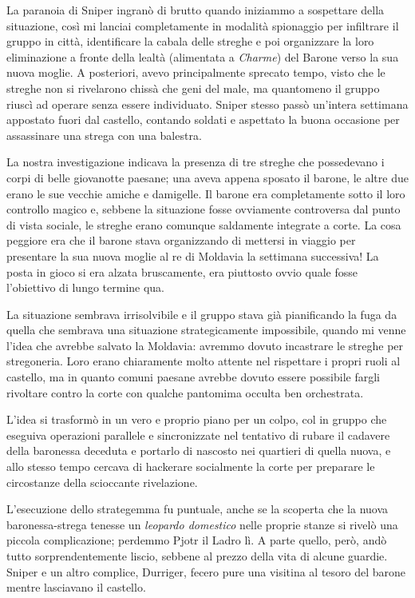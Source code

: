 La paranoia di Sniper ingranò di brutto quando iniziammo a sospettare della situazione, così mi lanciai completamente in modalità spionaggio per infiltrare il gruppo in città, identificare la cabala delle streghe e poi organizzare la loro eliminazione a fronte della lealtà (alimentata a \textit{Charme}) del Barone verso la sua nuova moglie. A posteriori, avevo principalmente sprecato tempo, visto che le streghe non si rivelarono chissà che geni del male, ma quantomeno il gruppo riuscì ad operare senza essere individuato. Sniper stesso passò un'intera settimana appostato fuori dal castello, contando soldati e aspettato la buona occasione per assassinare una strega con una balestra.

La nostra investigazione indicava la presenza di tre streghe che possedevano i corpi di belle giovanotte paesane; una aveva appena sposato il barone, le altre due erano le sue vecchie amiche e damigelle. Il barone era completamente sotto il loro controllo magico e, sebbene la situazione fosse ovviamente controversa dal punto di vista sociale, le streghe erano comunque saldamente integrate a corte. La cosa peggiore era che il barone stava organizzando di mettersi in viaggio per presentare la sua nuova moglie al re di Moldavia la settimana successiva! La posta in gioco si era alzata bruscamente, era piuttosto ovvio quale fosse l'obiettivo di lungo termine qua.

La situazione sembrava irrisolvibile e il gruppo stava già pianificando la fuga da quella che sembrava una situazione strategicamente impossibile, quando mi venne l'idea che avrebbe salvato la Moldavia: avremmo dovuto incastrare le streghe per stregoneria. Loro erano chiaramente molto attente nel rispettare i propri ruoli al castello, ma in quanto comuni paesane avrebbe dovuto essere possibile fargli rivoltare contro la corte con qualche pantomima occulta ben orchestrata.

L'idea si trasformò in un vero e proprio piano per un colpo, col in gruppo che eseguiva operazioni parallele e sincronizzate nel tentativo di rubare il cadavere della baronessa deceduta e portarlo di nascosto nei quartieri di quella nuova, e allo stesso tempo cercava di hackerare socialmente la corte per preparare le circostanze della scioccante rivelazione.

L'esecuzione dello strategemma fu puntuale, anche se la scoperta che la nuova baronessa-strega tenesse un \textit{leopardo domestico} nelle proprie stanze si rivelò una piccola complicazione; perdemmo Pjotr il Ladro lì. A parte quello, però, andò tutto sorprendentemente liscio, sebbene al prezzo della vita di alcune guardie. Sniper e un altro complice, Durriger, fecero pure una visitina al tesoro del barone mentre lasciavano il castello.

